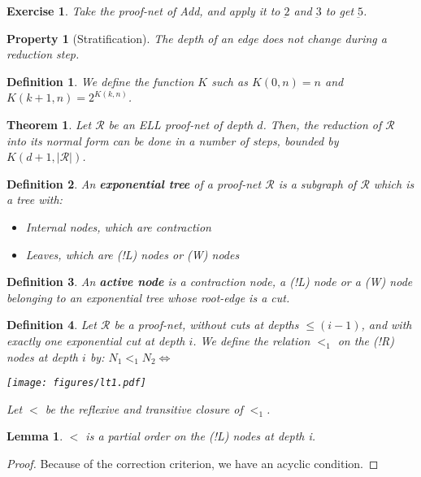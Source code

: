 \documentclass[a4paper,10pt]{article}
\newcommand{\pnet}{\mathcal{R}} %
\newtheorem{definition}{Definition}
\newtheorem{prop}{Property}
\newtheorem{thm}{Theorem}
\newtheorem{lem}{Lemma}
\newtheorem{exo}{Exercise}
\begin{document}
\begin{exo}
	Take the proof-net of Add, and apply it to $\underbar{2}$ and $\underbar{3}$ to get $\underbar{5}$.
\end{exo}

\begin{prop}[Stratification]
	The depth of an edge does not change during a reduction step.
\end{prop}

\begin{definition}
	We define the function $K$ such as $K(0,n)=n$ and $K(k+1,n) = 2^{K(k,n)}$.
\end{definition}

\begin{thm}
	Let $\pnet$ be an ELL proof-net of depth $d$. Then, the reduction of $\pnet$ into its normal form can be done in a number of steps, bounded by $K(d+1, |\pnet|)$.
\label{ComplexityThm}
\end{thm}

\begin{definition}
	An \textbf{exponential tree} of a proof-net $\pnet$ is a subgraph of $\pnet$ which is a tree with:
		\begin{itemize}
			\item Internal nodes, which are contraction
			\item Leaves, which are (!L) nodes or (W) nodes
		\end{itemize}
\end{definition}

\begin{definition}
	An \textbf{active node} is a contraction node, a (!L) node or a (W) node belonging to an exponential tree whose root-edge is a cut.
\end{definition}

\begin{definition}
 Let $\pnet$ be a proof-net, without cuts at depths $\leq (i-1)$, and with exactly one exponential cut at depth $i$. We define the relation $<_{1}$ on the (!R) nodes at depth $i$ by: $N_1 <_{1} N_2 \Leftrightarrow $
\begin{center}
	\texttt{[image: figures/lt1.pdf]}
\end{center}


 Let $<$ be the reflexive and transitive closure of $<_1$.

\end{definition}

\begin{lem}
	$<$ is a partial order on the (!L) nodes at depth i.
\end{lem}
\begin{proof}
	Because of the correction criterion, we have an acyclic condition.
\end{proof}
\end{document}
